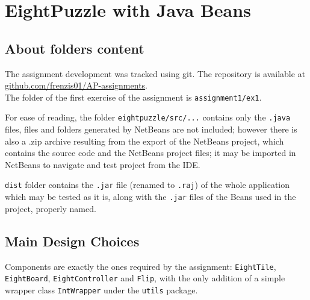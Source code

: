 \chapter{EightPuzzle with Java Beans}

\section{About folders content}

The assignment development was tracked using git. The repository is available at \href{https://github.com/frenzis01/AP-assignments}{github.com/frenzis01/AP-assignments}.\\
The folder of the first exercise of the assignment is \texttt{assignment1/ex1}.
 
For ease of reading, the folder \texttt{eightpuzzle/src/...} contains only the \texttt{.java} files, files and folders generated by NetBeans are not included; 
however there is also a .zip archive resulting from the export of the NetBeans project, which contains the source code and the NetBeans project files; it may be imported in NetBeans to navigate and test project from the IDE.

\texttt{dist} folder contains the \texttt{.jar} file (renamed to \texttt{.raj}) of the whole application which may be tested as it is, 
along with the \texttt{.jar} files of the Beans used in the project, properly named.


\section{Main Design Choices}

Components are exactly the ones required by the assignment: \lstinline|EightTile|, \lstinline|EightBoard|, \lstinline|EightController| and \lstinline|Flip|, with the only addition of a simple wrapper class \lstinline|IntWrapper| under the \lstinline|utils| package.

